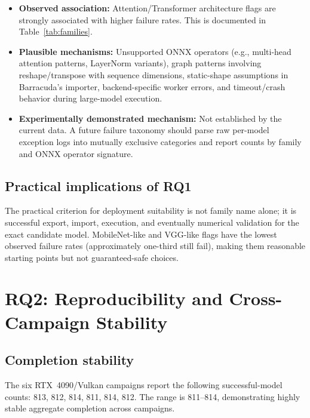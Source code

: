 \documentclass[10pt,twocolumn,letterpaper]{article}
\begin{document}
\begin{itemize}[nosep,leftmargin=*]
  \item \textbf{Observed association:} Attention/Transformer architecture flags are strongly associated with higher failure rates. This is documented in Table~\ref{tab:families}.
  \item \textbf{Plausible mechanisms:} Unsupported ONNX operators (e.g., multi-head attention patterns, LayerNorm variants), graph patterns involving reshape/transpose with sequence dimensions, static-shape assumptions in Barracuda's importer, backend-specific worker errors, and timeout/crash behavior during large-model execution.
  \item \textbf{Experimentally demonstrated mechanism:} Not established by the current data. A future failure taxonomy should parse raw per-model exception logs into mutually exclusive categories and report counts by family and ONNX operator signature.
\end{itemize}

\subsection{Practical implications of RQ1}

The practical criterion for deployment suitability is not family name alone; it is successful export, import, execution, and eventually numerical validation for the exact candidate model. MobileNet-like and VGG-like flags have the lowest observed failure rates (approximately one-third still fail), making them reasonable starting points but not guaranteed-safe choices.

\section{RQ2: Reproducibility and Cross-Campaign Stability}\label{sec:rq2}

\subsection{Completion stability}

The six RTX~4090/Vulkan campaigns report the following successful-model counts: 813, 812, 814, 811, 814, 812. The range is 811--814, demonstrating highly stable aggregate completion across campaigns.
\end{document}
